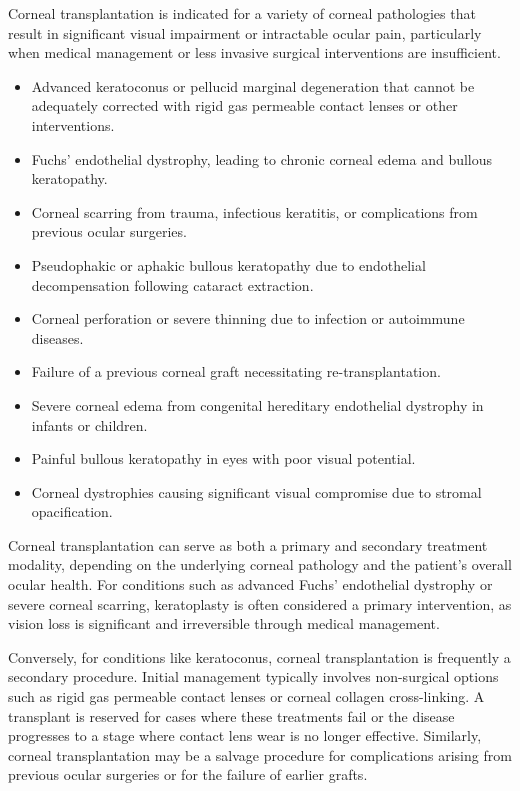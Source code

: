 Corneal transplantation is indicated for a variety of corneal pathologies that result in significant visual impairment or intractable ocular pain, particularly when medical management or less invasive surgical interventions are insufficient.

\begin{itemize}
  \item Advanced keratoconus or pellucid marginal degeneration that cannot be adequately corrected with rigid gas permeable contact lenses or other interventions.
  \item Fuchs' endothelial dystrophy, leading to chronic corneal edema and bullous keratopathy.
  \item Corneal scarring from trauma, infectious keratitis, or complications from previous ocular surgeries.
  \item Pseudophakic or aphakic bullous keratopathy due to endothelial decompensation following cataract extraction.
  \item Corneal perforation or severe thinning due to infection or autoimmune diseases.
  \item Failure of a previous corneal graft necessitating re-transplantation.
  \item Severe corneal edema from congenital hereditary endothelial dystrophy in infants or children.
  \item Painful bullous keratopathy in eyes with poor visual potential.
  \item Corneal dystrophies causing significant visual compromise due to stromal opacification.
\end{itemize}

Corneal transplantation can serve as both a primary and secondary treatment modality, depending on the underlying corneal pathology and the patient's overall ocular health. For conditions such as advanced Fuchs' endothelial dystrophy or severe corneal scarring, keratoplasty is often considered a primary intervention, as vision loss is significant and irreversible through medical management.

Conversely, for conditions like keratoconus, corneal transplantation is frequently a secondary procedure. Initial management typically involves non-surgical options such as rigid gas permeable contact lenses or corneal collagen cross-linking. A transplant is reserved for cases where these treatments fail or the disease progresses to a stage where contact lens wear is no longer effective. Similarly, corneal transplantation may be a salvage procedure for complications arising from previous ocular surgeries or for the failure of earlier grafts.

